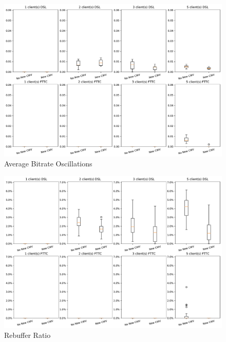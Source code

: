 \documentclass[10pt,sigconf]{acmart}
\begin{document}
  

\begin{figure}
  

      \includegraphics[width=\textwidth]{figures/Average_Oscillations.pdf}

      \caption{Average Bitrate Oscillations}
      \label{fig:avg-oscillations}
\end{figure}
\begin{figure}
      \includegraphics[width=\textwidth, keepaspectratio]{figures/Rebuffer_Ratio.pdf}
    \caption{Rebuffer Ratio}
    \label{fig:rebuffer-ratio}
\end{figure}
\end{document}
